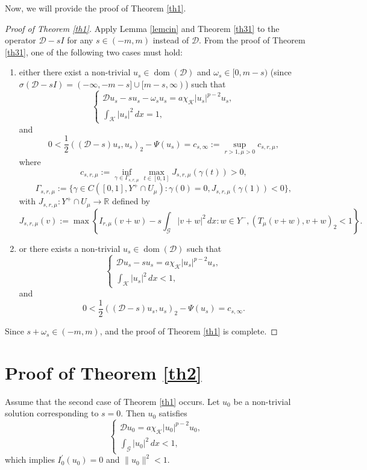 \documentclass[11pt]{amsart}
\newcommand{\abs}[1]{\lvert#1\rvert}
\newcommand{\norm}[1]{\lVert#1\rVert}
\newcommand{\D}{\mathcal{D}}
\newcommand{\G}{\mathcal{G}}
\newcommand{\K}{\mathcal{K}}
\numberwithin{equation}{section}
\begin{document}
Now, we will provide the proof of Theorem \ref{th1}.
\begin{proof}[Proof of Theorem \ref{th1}] Apply Lemma \ref{lemcin} and Theorem \ref{th31} to the operator $\D-sI$ for any $s \in (-m, m)$ instead of $\D$. From the proof of Theorem \ref{th31}, one of the following two cases must hold:
    \begin{enumerate}[label=\rm(\roman*)]
\item either there exist a non-trivial $u_{s} \in \operatorname{dom}(\D)$ and $\omega_{s} \in[0, m-s)$ (since $\sigma(\D- sI)=(-\infty,-m-s]\cup[m-s, \infty)$) such that
$$
\left\{\begin{array}{l}
\D u_s-su_{s}-\omega_{s} u_{s}=a\chi_{\K}\abs{u_{s}}^{p-2} u_{s}, \\
\int_{\K}\abs{u_{s}}^{2} \,dx=1,
\end{array}\right.
$$
and
$$
0<\frac{1}{2}((\D-s) u_{s}, u_{s})_{2}-\Psi(u_{s}) = c_{s,\infty}:=\sup _{ r>1, \mu>0} c_{s, r, \mu},
$$
where
$$c_{s, r, \mu} := \inf _{\gamma \in \Gamma_{s, r, \mu}} \max _{t \in[0,1]} J_{s, r, \mu}(\gamma(t))>0,$$
$$
\Gamma_{s, r, \mu} :=\{\gamma \in C([0,1], Y^{+} \cap U_{\mu}): \gamma(0)=0, J_{s, r, \mu}(\gamma(1))<0\},
$$
with $J_{s, r, \mu}: Y^+ \cap U_\mu \to \mathbb{R}$ defined by
$$
J_{s, r, \mu}(v):=\max \left\{I_{r, \mu}(v+w) -s \int_{\G}\abs{v+w}^2\, dx: w \in Y^{-},(T_{\mu}(v+w), v+w)_{2}<1\right\}.
$$
\item or there exists a non-trivial $u_{s} \in \operatorname{dom}(\D)$ such that
$$
\left\{\begin{array}{l}
\D u_s-su_{s}=a\chi_{\K}\abs{u_{s}}^{p-2} u_{s}, \\
\int_{\K}\abs{u_{s}}^{2} \,dx<1,
\end{array}\right.
$$
and
$$
0<\frac{1}{2}((\D-s) u_{s}, u_{s})_{2}-\Psi(u_{s}) = c_{s,\infty}.
$$
\end{enumerate}
Since $s+\omega_{s} \in(-m, m)$, and the proof of Theorem \ref{th1} is complete.
\end{proof}
\section{Proof of Theorem \ref{th2}}\label{sect4}
Assume that the second case of Theorem \ref{th1} occurs. Let $u_{0}$ be a non-trivial solution corresponding to $s =  0$. Then $u_{ 0}$ satisfies
$$
\left\{\begin{array}{l}
\D u_{ 0}=a \chi_{\K}\abs{u_{0}}^{p-2} u_{0}, \\
\int_{\G}\abs{u_{0}}^{2} \,dx<1,
\end{array}\right.
$$
which implies $I_{0}^{\prime}(u_0)=0$ and $\norm{u_0}^2<1$.
\end{document}
